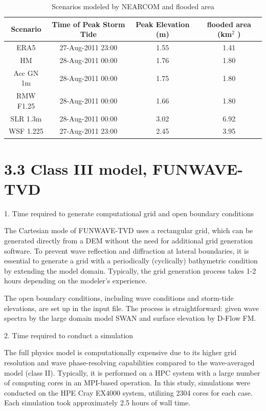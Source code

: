 \documentclass[11pt]{article}
\begin{document}
 \begin{table}[h!]
 \caption{Scenarios modeled by NEARCOM and flooded area}
 \centering
 \begin{tabular}[t]{c c c  c} \hline
  Scenario & Time of Peak Storm Tide  &  Peak Elevation (m)  &  flooded area (km$^2$ )    \\ \hline
  ERA5      & 27-Aug-2011 23:00  & 1.55   & 1.41  \\
  HM      & 28-Aug-2011 00:00  & 1.76   & 1.80 \\
  Acc GN 1m      & 28-Aug-2011 00:00  & 1.75   & 1.80  \\
  RMW F1.25      & 28-Aug-2011 00:00  & 1.66   & 1.80  \\
   SLR 1.3m      & 28-Aug-2011 00:00  & 3.02   & 6.92  \\
    WSF 1.225     & 27-Aug-2011 23:00  & 2.45   & 3.95  \\
     \hline
 \end{tabular}
\end{table}
 


\section*{3.3 Class III model, FUNWAVE-TVD}

1. Time required to generate computational grid and open boundary conditions

The Cartesian mode of FUNWAVE-TVD uses a rectangular grid, which can be generated directly from a DEM without the need for additional grid generation software. To prevent wave reflection and diffraction at lateral boundaries, it is essential to generate a grid with a periodically (cyclically) bathymetric condition by extending the model domain. Typically, the grid generation process takes 1-2 hours depending on the modeler's experience. 

The open boundary conditions, including wave conditions and storm-tide elevations, are set up in the input file. The process is straightforward:  given wave spectra by the large domain model SWAN and surface elevation by D-Flow FM. 


2. Time required to conduct a simulation 

 The full physics model is computationally expensive due to its higher grid resolution and wave phase-resolving capabilities compared to the wave-averaged model (class II). Typically, it is performed on a HPC system with a large number of computing cores in an MPI-based operation. In this study, simulations were conducted on the HPE Cray EX4000 system, utilizing 2304 cores for each case. Each simulation took approximately 2.5 hours of wall time. 
\end{document}
